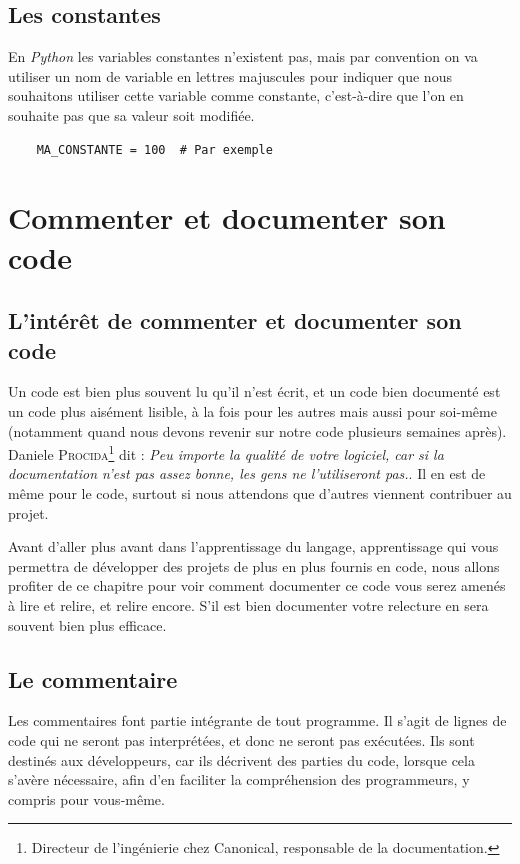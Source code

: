 \documentclass[a4paper,11pt]{book}
\begin{document}
\section{Les constantes}
En \textit{Python} les variables constantes n'existent pas, mais par convention on va utiliser un nom de variable en lettres majuscules pour indiquer que nous souhaitons utiliser cette variable comme constante, c'est-à-dire que l'on en souhaite pas que sa valeur soit modifiée.
\begin{verbatim}
    MA_CONSTANTE = 100  # Par exemple
\end{verbatim}
\medskip

\chapter{Commenter et documenter son code}
\section{L'intérêt de commenter et documenter son code}
Un code est bien plus souvent lu qu'il n'est écrit, et un code bien documenté est un code plus aisément lisible, à la fois pour les autres mais aussi pour soi-même (notamment quand nous devons revenir sur notre code plusieurs semaines après). Daniele \textsc{Procida}\footnote{Directeur de l'ingénierie chez Canonical, responsable de la documentation.} dit : \og \textit{Peu importe la qualité de votre logiciel, car si la documentation n'est pas assez bonne, les gens ne l'utiliseront pas.}\fg{}. Il en est de même pour le code, surtout si nous attendons que d'autres viennent contribuer au projet.
\medskip

Avant d'aller plus avant dans l'apprentissage du langage, apprentissage qui vous permettra de développer des projets de plus en plus fournis en code, nous allons profiter de ce chapitre pour voir comment documenter ce code vous serez amenés à lire et relire, et relire encore. S'il est bien documenter votre relecture en sera souvent bien plus efficace.
\medskip

\section{Le commentaire}
Les commentaires font partie intégrante de tout programme. Il s'agit de lignes de code qui ne seront pas interprétées, et donc ne seront pas exécutées. Ils sont destinés aux développeurs, car ils décrivent des parties du code, lorsque cela s'avère nécessaire, afin d'en faciliter la compréhension des programmeurs, y compris pour vous-même.
\medskip
\end{document}
